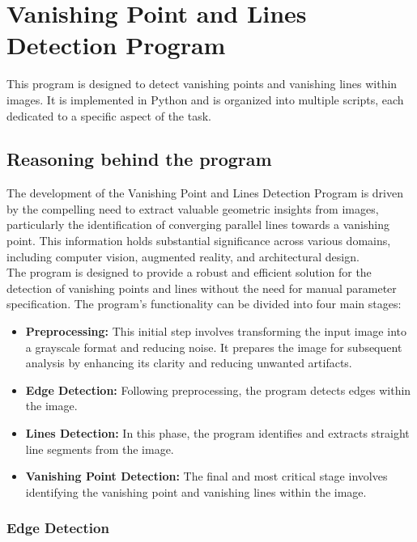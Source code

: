 \section{Vanishing Point and Lines Detection Program}
\label{sec:program}

This program is designed to detect vanishing points and vanishing lines within images.
It is implemented in Python and is organized into multiple scripts, each dedicated to a specific aspect of the task.

\subsection{Reasoning behind the program}
\label{subsec:reasoning}

The development of the Vanishing Point and Lines Detection Program is driven by the compelling need to extract valuable geometric insights from images,
particularly the identification of converging parallel lines towards a vanishing point.
This information holds substantial significance across various domains, including computer vision, augmented reality, and architectural design.\\
The program is designed to provide a robust and efficient solution for the detection of vanishing points and lines
without the need for manual parameter specification.
The program's functionality can be divided into four main stages:

\begin{itemize}
    \item \textbf{Preprocessing:} This initial step involves transforming the input image into a grayscale format and reducing noise.
          It prepares the image for subsequent analysis by enhancing its clarity and reducing unwanted artifacts.
    \item \textbf{Edge Detection:} Following preprocessing, the program detects edges within the image.
    \item \textbf{Lines Detection:} In this phase, the program identifies and extracts straight line segments from the image.
    \item \textbf{Vanishing Point Detection:} The final and most critical stage involves identifying the vanishing point and vanishing lines within the image.
\end{itemize}


\subsubsection*{Edge Detection}
\label{subsubsec:edge-detection}

